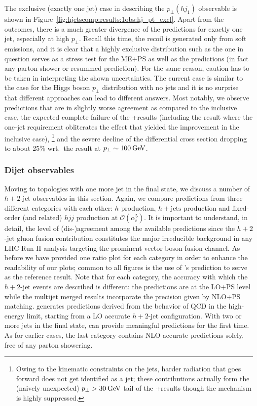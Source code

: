 The exclusive (exactly one jet) case in describing the $p_\perp(hj_1)$
observable is shown in Figure~\ref{fig:hjetscomp:results:1obs:hj_pt_excl}.
Apart from the \NNLOPS outcomes, there is a much greater divergence of
the predictions for exactly one jet, especially at high $p_\perp$.
Recall this time, the recoil is generated only from soft emissions, and
it is clear that a highly exclusive distribution such as the one in
question serves as a stress test for the ME+PS as well as the \NNLOPS
predictions (in fact any parton shower or resummed prediction). For
the same reason, caution has to be taken in interpreting the shown
uncertainties. The current case is similar to the case for the Higgs
boson $p_\perp$ distribution with no jets and it is no surprise that
different approaches can lead to different answers. Most notably, we
observe \NNLOPS predictions that are in slightly worse agreement as
compared to the inclusive case, the expected complete failure of the
\GoSam{}+\Sherpa results (including the \Loopsim result where the
one-jet requirement obliterates the effect that yielded the
improvement in the inclusive case),%
\footnote{Owing to the kinematic constraints on the jets, harder
  radiation that goes forward does not get identified as a jet;
  these contributions actually form the (naively unexpected)
  $p_\perp>30\text{\:GeV}$ tail of the \GoSam{}+\Sherpa results though the mechanism is
  highly suppressed.}
and the severe decline of the \Herwig differential cross section
dropping to about 25\% wrt.~the \Powheg result at $p_\perp\sim100\text{\:GeV}$.



\subsubsection{Dijet observables}
\label{sec:hjetscomp:results:2jobs}

Moving to topologies with one more jet in the final state, 
we discuss a number of $h+2$-jet
observables in this section. Again, we compare predictions from three
different categories with each other: \NNLOPS $h$ production,
\MEPSatNLO $h+\text{jets}$ production and fixed-order (and related)
$hjj$ production at $\mathcal{O}(\alpha_\mathrm{s}^5)$. It is important
to understand, in detail, the level of (dis-)agreement among the
available predictions since the $h+2$-jet gluon fusion contribution
constitutes the major irreducible background in any LHC Run-II analysis
targeting the prominent vector boson fusion channel. As before we have
provided one ratio plot for each category in order to enhance the
readability of our plots; common to all figures is the use of \Powheg's
\NNLOPS prediction to serve as the reference result. Note that for
each category, the accuracy with which the $h+2$-jet events are
described is different: the \NNLOPS predictions are at the LO+PS level
while the multijet merged results incorporate the precision given by NLO+PS
matching. \Hej generates predictions derived from the behavior of QCD
in the high-energy limit, starting from a LO accurate $h+2$-jet configuration.
With two or more jets in the final state,
\Hej can provide meaningful predictions for the first time. As
for earlier cases, the last category contains NLO accurate predictions
solely, free of any parton showering.

